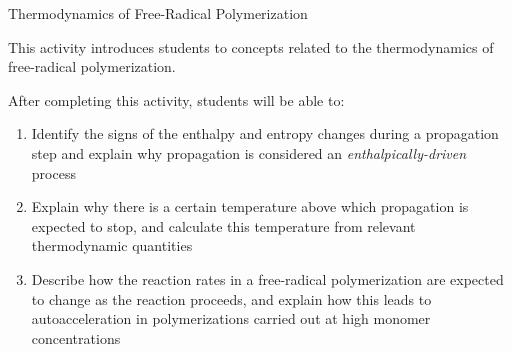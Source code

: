 %
%
%
%

\renewcommand{\figpath}{content/polymchem/freeradical/FRPthermo/figs}
\renewcommand{\labelbase}{FRPthermo}

\begin{activity}{Thermodynamics of Free-Radical Polymerization}

\begin{instructornotes}
	This activity introduces students to concepts related to the thermodynamics of free-radical polymerization.
	
	After completing this activity, students will be able to:
	\begin{enumerate}
		\item Identify the signs of the enthalpy and entropy changes during a propagation step and explain why propagation is considered an \emph{enthalpically-driven} process
		\item Explain why there is a certain temperature above which propagation is expected to stop, and calculate this temperature from relevant thermodynamic quantities
		\item Describe how the reaction rates in a free-radical polymerization are expected to change as the reaction proceeds, and explain how this leads to autoacceleration in polymerizations carried out at high monomer concentrations
	\end{enumerate}
	

\end{instructornotes}
\end{activity}
